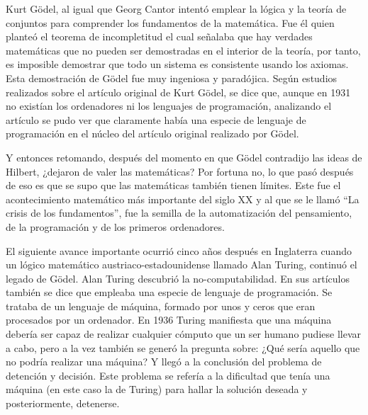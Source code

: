 \documentclass[11pt,letterpaper]{article}
\begin{document}
\vspace{10PT}

Kurt Gödel, al igual que Georg Cantor intentó emplear la lógica y la teoría de conjuntos para comprender los fundamentos de la matemática. Fue él quien planteó el teorema de incompletitud el cual señalaba que hay verdades matemáticas que no pueden ser demostradas en el interior de la teoría, por tanto, es imposible demostrar que todo un sistema es consistente usando los axiomas. Esta demostración de Gödel fue muy ingeniosa y paradójica. Según estudios realizados sobre el artículo original de Kurt Gödel, se dice que, aunque en 1931 no existían los ordenadores ni los lenguajes de programación, analizando el artículo se pudo ver que claramente había una especie de lenguaje de programación en el núcleo del artículo original realizado por Gödel.

\vspace{10PT}

Y entonces retomando,  después del momento en que Gödel contradijo las ideas de Hilbert, ¿dejaron de valer las matemáticas? Por fortuna no, lo que pasó después de eso es que se supo que las matemáticas también tienen límites. Este fue el acontecimiento matemático más importante del siglo XX y al que se le llamó “La crisis de los fundamentos”, fue la semilla de la automatización del pensamiento, de la programación y de los primeros ordenadores. 

\vspace{10PT}

El siguiente avance importante ocurrió cinco años después en Inglaterra cuando un lógico matemático austriaco-estadounidense llamado Alan Turing, continuó el legado de Gödel. Alan Turing descubrió la no-computabilidad. En sus artículos también se dice que empleaba una especie de lenguaje de programación. Se trataba de un lenguaje de máquina, formado por unos y ceros que eran procesados por un ordenador.  En 1936 Turing manifiesta que una máquina debería ser capaz de realizar cualquier cómputo que un ser humano pudiese llevar a cabo, pero a la vez también se generó la pregunta sobre: ¿Qué sería aquello que no podría realizar una máquina? Y llegó a la conclusión del problema de detención y decisión. Este problema se refería a la dificultad que tenía una máquina (en este caso la de Turing) para hallar la solución deseada y posteriormente, detenerse. 
\end{document}
